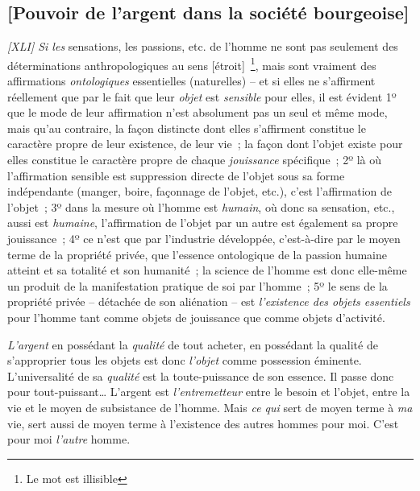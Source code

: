 \documentclass[french,twoside]{book} %
\begin{document}
\subsection[{[Pouvoir de l’argent dans la société bourgeoise]}]{[Pouvoir de l’argent dans la société bourgeoise]}
\noindent \emph{[XLI] Si les} sensations, les passions, etc. de l’homme ne sont pas seulement des déterminations anthropologiques au sens [étroit] \footnote{Le mot est illisible}, mais sont vraiment des affirmations \emph{ontologiques} essentielles (naturelles) – et si elles ne s’affirment réellement que par le fait que leur \emph{objet} est \emph{sensible} pour elles, il est évident 1º que le mode de leur affirmation n’est absolument pas un seul et même mode, mais qu’au contraire, la façon distincte dont elles s’affirment constitue le caractère propre de leur existence, de leur vie ; la façon dont l’objet existe pour elles constitue le caractère propre de chaque \emph{jouissance} spécifique ; 2º là où l’affirmation sensible est suppression directe de l’objet sous sa forme indépendante (manger, boire, façonnage de l’objet, etc.), c’est l’affirmation de l’objet ; 3º dans la mesure où l’homme est \emph{humain}, où donc sa sensation, etc., aussi est \emph{humaine}, l’affirmation de l’objet par un autre est également sa propre jouissance ; 4º ce n’est que par l’industrie développée, c’est-à-dire par le moyen terme de la propriété privée, que l’essence ontologique de la passion humaine atteint et sa totalité et son humanité ; la science de l’homme est donc elle-même un produit de la manifestation pratique de soi par l’homme ; 5º le sens de la propriété privée – détachée de son aliénation – est \emph{l’existence des objets essentiels} pour l’homme tant comme objets de jouissance que comme objets d’activité.\par
\emph{L’argent} en possédant la \emph{qualité} de tout acheter, en possédant la qualité de s’approprier tous les objets est donc \emph{l’objet} comme possession éminente. L’universalité de sa \emph{qualité} est la toute-puissance de son essence. Il passe donc pour tout-puissant… L’argent est \emph{l’entremetteur} entre le besoin et l’objet, entre la vie et le moyen de subsistance de l’homme. Mais \emph{ce qui} sert de moyen terme à \emph{ma} vie, sert aussi de moyen terme à l’existence des autres hommes pour moi. C’est pour moi \emph{l’autre} homme.\par
\end{document}
